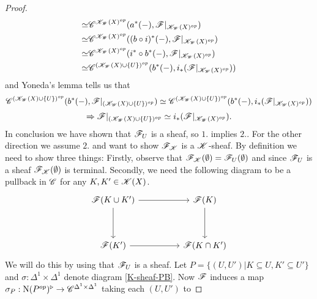 \documentclass[../thesis.tex]{subfiles}
\begin{document}
\begin{proof}
\begin{align}
        \simeq                                                                                & \mathscr{C}^{\mathscr{K}_{\mathscr{W}}(X)^{op}}(a^*({-}), \mathscr{F}|_{\mathscr{K}_{\mathscr{W}}(X)^{op}})                  \\
        \simeq                                                                                & \mathscr{C}^{\mathscr{K}_{\mathscr{W}}(X)^{op}}((b\circ i)^*({-}), \mathscr{F}|_{\mathscr{K}_{\mathscr{W}}(X)^{op}})         \\        \simeq                                                                             & \mathscr{C}^{\mathscr{K}_{\mathscr{W}}(X)^{op}}(i^* \circ b^*({-}), \mathscr{F}|_{\mathscr{K}_{\mathscr{W}}(X)^{op}})            \\
        \simeq                                                                                & \mathscr{C}^{(\mathscr{K}_{\mathscr{W}}(X)\cup \{U\})^{op}}(b^*({-}), i_*(\mathscr{F}|_{\mathscr{K}_{\mathscr{W}}(X)^{op}}))
    \end{align}
    and Yoneda's lemma tells us that
    \[\mathscr{C}^{(\mathscr{K}_{\mathscr{W}}(X)\cup \{U\})^{op}}(b^*({-}),\mathscr{F}|_{(\mathscr{K}_{\mathscr{W}}(X)\cup \{U\})^{op}}) \simeq \mathscr{C}^{(\mathscr{K}_{\mathscr{W}}(X)\cup \{U\})^{op}}(b^*({-}), i_*(\mathscr{F}|_{\mathscr{K}_{\mathscr{W}}(X)^{op}}))\]
    \[\Rightarrow \mathscr{F}|_{(\mathscr{K}_{\mathscr{W}}(X)\cup \{U\})^{op}} \simeq i_*(\mathscr{F}|_{\mathscr{K}_{\mathscr{W}}(X)^{op}}).\]
    In conclusion we have shown that $\mathscr{F}_{U}$ is a sheaf, so $1.$ implies $2.$.
    For the other direction we assume $2.$ and want to show $\mathscr{F}_{\mathscr{K}}$ is a $\mathscr{K}$-sheaf. By definition we need to show three things:
    Firstly, observe that $\mathscr{F}_{\mathscr{K}}(\emptyset) = \mathscr{F}_{U}(\emptyset)$ and since $\mathscr{F}_{U}$ is a sheaf $\mathscr{F}_{\mathscr{K}}(\emptyset)$ is terminal.
    Secondly, we need the following diagram to be a pullback in $\mathscr{C}$ for any $K,K' \in \mathscr{K}(X)$.
    \begin{equation}\label{K-sheaf-PB}
        \begin{tikzcd}
            {\F(K \cup K')} && {\F(K)} \\
            \\
            {\F(K')} && {\F(K\cap K')}
            \arrow[from=1-3, to=3-3]
            \arrow[from=3-1, to=3-3]
            \arrow[from=1-1, to=3-1]
            \arrow[from=1-1, to=1-3]
        \end{tikzcd}
    \end{equation}
    We will do this by using that $\mathscr{F}_{U}$ is a sheaf.
    Let $P = \{(U,U') | K \subseteq U, K' \subseteq U'\}$ and $\sigma: \Delta^1\times\Delta^1$ denote diagram \ref{K-sheaf-PB}.
    Now $\mathscr{F}$ induces a map $\sigma_P: \mathrm{N}(P^{op})^{\triangleright} \to \mathscr{C}^{\Delta^1\times\Delta^1}$ taking each $(U, U')$ to

\end{proof}
\end{document}
